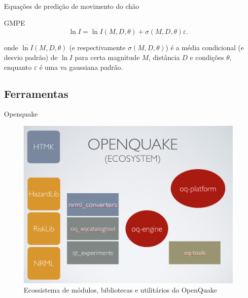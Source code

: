 \documentclass[ucs,8pt]{beamer}
\begin{document}
\begin{frame}{Equações de predição de movimento do chão}	
	\begin{block}{GMPE}
		\begin{equation} \label{pgamodel}
		\ln I = \overline{\ln I}(M, D, \theta) + \sigma(M, D, \theta) \varepsilon.
		\end{equation}
	\end{block}
	onde $\overline{\ln I}(M, D, \theta)$ (e respectivamente $\sigma(M, D,
	\theta)$) é a média condicional (e desvio padrão) de $\ln I$ para certa magnitude $M$, distância $D$
	e condições $\theta$, enquanto $\varepsilon$ é uma \gls{va} gaussiana padrão.
\end{frame}



\subsection{Ferramentas}
\begin{frame}{Openquake}
\begin{figure}[!h]
  \centering
  \includegraphics[height=.90\textheight]{oq_ecosystem} 
  \caption{Ecossistema de módulos, bibliotecas e utilitários do OpenQuake}
  \label{fig:oq} 
\end{figure}
\end{frame}
\end{document}
